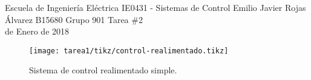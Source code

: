 \documentclass{ucrEieTarea}
\begin{document}
    {Escuela de Ingeniería Eléctrica}
    {IE0431 - Sistemas de Control}
    {Emilio Javier Rojas Álvarez}
    {B15680}
    {Grupo 901}
    {Tarea \#2\\{\footnotesize{} de Enero de 2018}}
  
  \begin{figure}[H]
    \centering
    \texttt{[image: tarea1/tikz/control-realimentado.tikz]}
    \caption{Sistema de control realimentado simple.}
    \label{img:ejercicio1}
  \end{figure}
  
  \newpage
  
\end{document}
